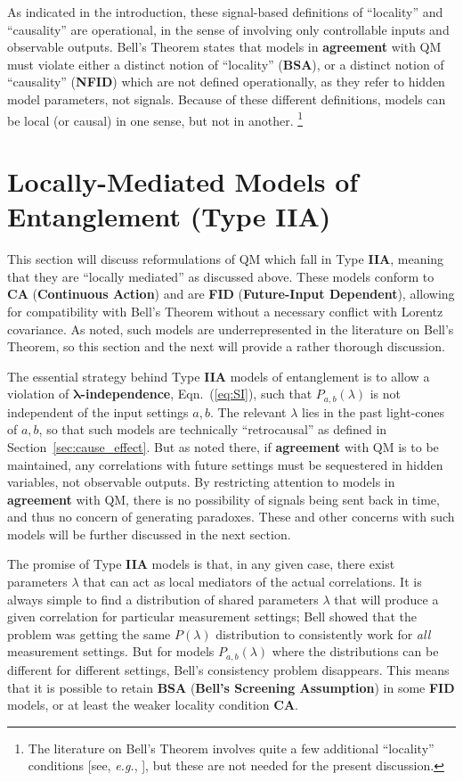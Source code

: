 \documentclass[rmp, aps, preprint, longbibliography]{revtex4-1}
\begin{document}
As indicated in the introduction, these signal-based definitions of ``locality'' and ``causality'' are operational, in the sense of involving only controllable inputs and observable outputs.  Bell's Theorem states that models in {\bf agreement} with QM must violate either a distinct notion of ``locality'' ({\bf BSA}), or a distinct notion of ``causality'' ({\bf NFID}) which are not defined operationally, as they refer to hidden model parameters, not signals.   Because of these different definitions, models can be local (or causal) in one sense, but not in another.%
\footnote{The literature on Bell's Theorem involves quite a few additional ``locality'' conditions [see, \emph{e.g.}, \textcite{wiseman2014}], but these are not needed for the present discussion.}


\section{Locally-Mediated Models of Entanglement (Type {\bf IIA}) }
\label{sec:TypeIIA}

This section will discuss reformulations of QM which fall in Type {\bf IIA}, meaning that they are ``locally mediated'' as discussed above.  These models conform to {\bf CA} ({\bf Continuous Action}) and are {\bf FID} ({\bf Future-Input Dependent}), allowing for compatibility with Bell's Theorem without a necessary conflict with Lorentz covariance.  As noted, such models are underrepresented in the literature on Bell's Theorem, so this section and the next will provide a rather thorough discussion.  

The essential strategy behind Type {\bf IIA} models of entanglement is to allow a violation of {\bf $\bm{\lambda}$-independence}, Eqn.~(\ref{eq:SI}), such that $P_{a,b}(\lambda)$ is not independent of the input settings $a,b$.  The relevant $\lambda$ lies in the past light-cones of $a,b$, so that such models are technically ``retrocausal'' as defined in Section~\ref{sec:cause_effect}.  But as noted there, if {\bf agreement} with QM is to be maintained, any correlations with future settings must be sequestered in hidden variables, not observable outputs.  By restricting attention to models in {\bf agreement} with QM, there is no possibility of signals being sent back in time, and thus no concern of generating paradoxes.  These and other concerns with such models will be further discussed in the next section.  

The promise of Type {\bf IIA} models is that, in any given case, there exist parameters $\lambda$ that can act as local mediators of the actual correlations.  It is always simple to find a distribution of shared parameters $\lambda$ that will produce a given correlation for particular measurement settings; Bell showed that the problem was getting the same $P(\lambda)$ distribution to consistently work for \emph{all} measurement settings.  But for models $P_{a,b}(\lambda)$ where the distributions can be different for different settings, Bell's consistency problem disappears. This means that it is possible to retain {\bf BSA} ({\bf Bell's Screening Assumption}) in some {\bf FID} models, or at least the weaker locality condition {\bf CA}.  
\end{document}
